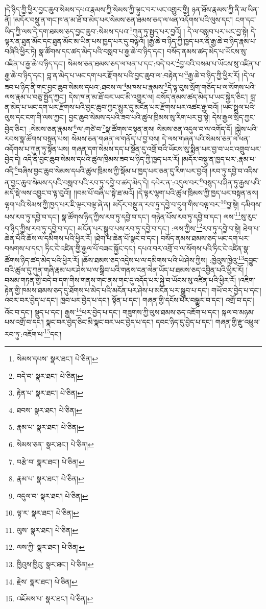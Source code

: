 །དེ་ཉིད་ཀྱི་ཕྱིར་བྱང་ཆུབ་སེམས་དཔའ་རྣམས་ཀྱི་སེམས་ཀྱི་ལྟུང་བར་ཡང་འགྱུར་གྱི། ཉན་ཐོས་རྣམས་ཀྱི་ནི་མ་ཡིན་ནོ། །མདོར་བསྡུ་ན་གང་ཁ་ན་མ་ཐོ་བ་མེད་པར་སེམས་ཅན་ཐམས་ཅད་ལ་ཕན་འདོགས་པའི་ལུས་དང་། ངག་དང་ཡིད་ཀྱི་ལས་དེ་དག་ཐམས་ཅད་བྱང་ཆུབ་:སེམས་དཔའ་\footnote{སེམས་དཔས་  སྣར་ཐང་།  པེ་ཅིན། }ཀུན་ཏུ་སྤྱད་པར་བྱའོ། །
དེ་ལ་བསླབ་པར་ཡང་བྱ་སྟེ། དེ་ལྟར་ན་ཐུན་མོང་དང་ཐུན་མོང་མ་ཡིན་པས་ཁྱད་པར་དུ་བལྟའོ། །རྒྱ་ཆེ་བ་ཉིད་ཀྱི་ཁྱད་པར་ནི་རྒྱ་ཆེ་བ་ཉིད་རྣམ་པ་བཞིའི་ཕྱིར་ཏེ། སྣ་ཚོགས་དང་ཚད་མེད་པའི་བསླབ་པ་རྒྱ་ཆེ་བ་ཉིད་དང་། བསོད་ནམས་ཚད་མེད་པ་ཡོངས་སུ་འཛིན་པ་རྒྱ་ཆེ་བ་ཉིད་དང་། སེམས་ཅན་ཐམས་ཅད་ལ་ཕན་པ་དང་:བདེ་བར་\footnote{བདེ་བ་  སྣར་ཐང་།  པེ་ཅིན། }བྱ་བའི་བསམ་པ་ཡོངས་སུ་འཛིན་པ་རྒྱ་ཆེ་བ་ཉིད་དང་། བླ་ན་མེད་པ་ཡང་དག་པར་རྫོགས་པའི་བྱང་ཆུབ་ལ་:བརྟེན་པ་\footnote{རྟེན་པ་  སྣར་ཐང་།  པེ་ཅིན། }རྒྱ་ཆེ་བ་ཉིད་ཀྱི་ཕྱིར་རོ། །དེ་ལ་ཟབ་པ་ཉིད་ནི་གང་བྱང་ཆུབ་སེམས་དཔའ་:ཐབས་ལ་\footnote{ཐབས་  སྣར་ཐང་།  པེ་ཅིན། }མཁས་པ་རྣམས་\footnote{རྣམ་པ་  སྣར་ཐང་།  པེ་ཅིན། }དེ་ལྟ་བུས་སྲོག་གཅོད་པ་ལ་སོགས་པའི་ལས་རྣམ་པ་བཅུ་སྤྱོད་ཀྱང་། དེས་ཁ་ན་མ་ཐོ་བར་ཡང་མི་འགྱུར་ལ། བསོད་ནམས་ཚད་མེད་པ་ཡང་སྐྱེད་ཅིང་། བླ་ན་མེད་པ་ཡང་དག་པར་རྫོགས་པའི་བྱང་ཆུབ་ཀྱང་མྱུར་དུ་མངོན་པར་རྫོགས་པར་འཚང་རྒྱ་བའོ། །ཡང་སྤྲུལ་པའི་ལུས་དང་ངག་གི་ལས་ཀྱང་། བྱང་ཆུབ་སེམས་དཔའི་ཟབ་པའི་ཚུལ་ཁྲིམས་སུ་རིག་པར་བྱ་སྟེ། དེས་རྒྱལ་སྲིད་ཀྱང་བྱེད་ཅིང་། :སེམས་ཅན་རྣམས་\footnote{སེམས་ཅན་  སྣར་ཐང་།  པེ་ཅིན། }ལ་:གཙེ་བ་\footnote{བརྩེ་བ་  སྣར་ཐང་།  པེ་ཅིན། }སྣ་ཚོགས་བསྟན་ནས། སེམས་ཅན་འདུལ་བ་ལ་འགོད་དོ། །སྐྱེས་པའི་རབས་སྣ་ཚོགས་བསྟན་པས། སེམས་ཅན་གཞན་ལ་གནོད་པ་བྱ་བས། དེ་ལས་གཞན་པའི་སེམས་ཅན་ལ་ཕན་འདོགས་པ་ཀུན་ཏུ་སྟོན་པས། གཞན་དག་སེམས་དད་པ་སྔོན་དུ་འགྲོ་བའི་ཡོངས་སུ་སྨིན་པར་བྱ་བ་ཡང་འགྲུབ་པར་བྱེད་དེ། འདི་ནི་བྱང་ཆུབ་སེམས་དཔའི་ཚུལ་ཁྲིམས་ཟབ་པ་ཉིད་ཀྱི་ཁྱད་པར་རོ། །མདོར་བསྡུ་ན་ཁྱད་པར་:རྣམ་པ་འདི་\footnote{རྣམ་པ་  སྣར་ཐང་།  པེ་ཅིན། }བཞིས་བྱང་ཆུབ་སེམས་དཔའི་ཚུལ་ཁྲིམས་ཀྱི་སྡོམ་པ་ཁྱད་པར་ཅན་དུ་རིག་པར་བྱའོ། །རབ་ཏུ་དབྱེ་བ་འདིས་ན་བྱང་ཆུབ་སེམས་དཔའི་བསླབ་པའི་རབ་ཏུ་དབྱེ་བ་ཚད་མེད་དེ། དཔེར་ན་:འདུལ་བར་\footnote{འདུལ་བ་  སྣར་ཐང་།  པེ་ཅིན། }བསྙད་པ་ཤིན་ཏུ་རྒྱས་པའི་མདོ་སྡེ་ལས་འབྱུང་བ་ལྟ་བུའོ།། །།བམ་པོ་བཞི་པ་སྟེ་ཐ་མའོ། །དེ་ལྟར་ལྷག་པའི་ཚུལ་ཁྲིམས་ཀྱི་ཁྱད་པར་བསྟན་ནས། ལྷག་པའི་སེམས་ཀྱི་ཁྱད་པར་ཇི་ལྟར་བལྟ་ཞེ་ན། མདོར་བསྡུ་ན་རབ་ཏུ་དབྱེ་བ་དྲུག་གིས་བལྟ་བར་\footnote{ལྟ་ར་  སྣར་ཐང་།  པེ་ཅིན། }བྱ་སྟེ། དམིགས་པས་རབ་ཏུ་དབྱེ་བ་དང་། སྣ་ཚོགས་ཉིད་ཀྱིས་རབ་ཏུ་དབྱེ་བ་དང་། གཉེན་པོས་རབ་ཏུ་དབྱེ་བ་དང་། ལས་\footnote{ལུས་  སྣར་ཐང་།  པེ་ཅིན། }སུ་རུང་བ་ཉིད་ཀྱིས་རབ་ཏུ་དབྱེ་བ་དང་། མངོན་པར་སྒྲུབ་པས་རབ་ཏུ་དབྱེ་བ་དང་། :ལས་ཀྱིས་\footnote{ལས་ཀྱི་  སྣར་ཐང་།  པེ་ཅིན། }རབ་ཏུ་དབྱེ་བ་སྟེ། ཐེག་པ་ཆེན་པོའི་ཆོས་ལ་དམིགས་པའི་ཕྱིར་རོ། །ཐེག་པ་ཆེན་པོ་སྣང་བ་དང་། བསོད་ནམས་ཐམས་ཅད་ཡང་དག་པར་བསགས་པ་དང་། ཏིང་ངེ་འཛིན་གྱི་རྒྱལ་པོ་བཟང་སྐྱོང་དང་། དཔའ་བར་འགྲོ་བ་ལ་སོགས་པའི་ཏིང་ངེ་འཛིན་སྣ་ཚོགས་ཉིད་ཚད་མེད་པའི་ཕྱིར་རོ། །ཆོས་ཐམས་ཅད་འདྲེས་པ་ལ་དམིགས་པའི་ཡེ་ཤེས་ཀྱིས། :ཁྱེའུས་ཁྱེའུ་\footnote{ཁྱིའུས་ཁྱིའུ་  སྣར་ཐང་།  པེ་ཅིན། }དབྱུང་བའི་ཚུལ་དུ་ཀུན་གཞི་རྣམ་པར་ཤེས་པ་ལ་སྒྲིབ་པའི་གནས་ངན་ལེན་ཡོད་པ་ཐམས་ཅད་འབྱིན་པའི་ཕྱིར་རོ། །བསམ་གཏན་གྱི་བདེ་བ་དག་གིས་གནས་གང་ནས་གང་དུ་འདོད་པར་སྐྱེ་བ་ཡོངས་སུ་འཛིན་པའི་ཕྱིར་རོ། །འཇིག་རྟེན་གྱི་ཁམས་ཐམས་ཅད་དུ་ཐོགས་པ་མེད་པའི་མངོན་པར་ཤེས་པ་མངོན་པར་སྒྲུབ་པ་དང་། གཡོ་བར་བྱེད་པ་དང་། འབར་བར་བྱེད་པ་དང་། ཁྱབ་པར་བྱེད་པ་དང་། སྟོན་པ་དང་། གཞན་གྱི་དངོས་པོར་བསྒྱུར་བ་དང་། འགྲོ་བ་དང་། འོང་བ་དང་། སྡུད་པ་དང་། རྒྱས་\footnote{རྗེས་  སྣར་ཐང་།  པེ་ཅིན། }པར་བྱེད་པ་དང་། གཟུགས་ཀྱི་ལུས་ཐམས་ཅད་འཇོག་པ་དང་། སྐལ་བ་མཉམ་པས་འགྲོ་བ་དང་། སྣང་བར་བྱེད་ཅིང་མི་སྣང་བར་ཡང་བྱེད་པ་དང་། དབང་ཉིད་དུ་བྱེད་པ་དང་། གཞན་གྱི་རྫུ་འཕྲུལ་རབ་ཏུ་:འཇོག་པ་\footnote{འཇོམས་པ་  སྣར་ཐང་།  པེ་ཅིན། }དང་། 